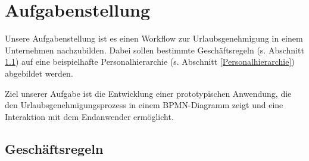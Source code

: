 \section{Aufgabenstellung}
Unsere Aufgabenstellung ist es einen Workflow zur Urlaubsgenehmigung in einem Unternehmen nachzubilden. Dabei sollen bestimmte Geschäftsregeln (s. Abschnitt \ref{Geschäftsregeln}) auf eine beispielhafte Personalhierarchie (s. Abschnitt \ref{Personalhierarchie}) abgebildet werden.

Ziel unserer Aufgabe ist die Entwicklung einer prototypischen Anwendung, die den Urlaubsgenehmigungsprozess in einem BPMN-Diagramm zeigt und eine Interaktion mit dem Endanwender ermöglicht.

\subsection{Geschäftsregeln}
\label{Geschäftsregeln}

